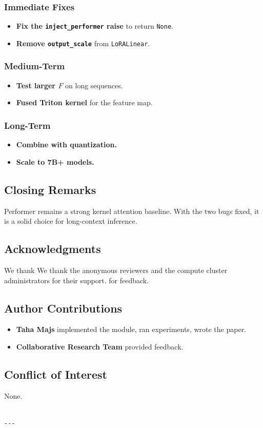 \subsubsection{Immediate Fixes}

\begin{itemize}
\item \textbf{Fix the \texttt{inject\_performer} raise} to return \texttt{None}.
\item \textbf{Remove \texttt{output\_scale}} from \texttt{LoRALinear}.

\end{itemize}
\subsubsection{Medium-Term}

\begin{itemize}
\item \textbf{Test larger $F$} on long sequences.
\item \textbf{Fused Triton kernel} for the feature map.

\end{itemize}
\subsubsection{Long-Term}

\begin{itemize}
\item \textbf{Combine with quantization.}
\item \textbf{Scale to 7B+ models.}

\end{itemize}
\subsection{Closing Remarks}

Performer remains a strong kernel attention baseline. With the two bugs 
fixed, it is a solid choice for long-context inference.

\subsection{Acknowledgments}

We thank We thank the anonymous reviewers and the compute cluster administrators for their support. for feedback.

\subsection{Author Contributions}

\begin{itemize}
\item \textbf{Taha Majs} implemented the module, ran experiments, wrote the paper.
\item \textbf{Collaborative Research Team} provided feedback.

\end{itemize}
\subsection{Conflict of Interest}

None.
\begin{lstlisting}

---
\end{lstlisting}